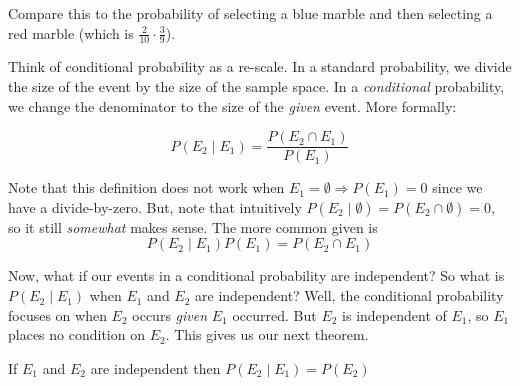 \documentclass[main.tex]{subfiles}
\begin{document}

\begin{rem}
	Compare this to the probability of selecting a blue marble and then selecting a red marble (which is \(\frac{2}{10} \cdot \frac{3}{9}\)).
\end{rem}

Think of conditional probability as a re-scale.
In a standard probability, we divide the size of the event by the size of the sample space.
In a \textit{conditional} probability, we change the denominator to the size of the \textit{given} event.
More formally:

\begin{prop}
	\[P(E_2 \mid E_1) = \frac{P(E_2 \cap E_1)}{P(E_1)}\]
\end{prop}

\begin{rem}
	Note that this definition does not work when \(E_1 = \emptyset \Rightarrow P(E_1) = 0\) since we have a divide-by-zero.
	But, note that intuitively \(P(E_2 \mid \emptyset) = P(E_2 \cap \emptyset) = 0\), so it still \textit{somewhat} makes sense.
	The more common  given is
	\[P(E_2 \mid E_1)P(E_1) = P(E_2 \cap E_1)\]
\end{rem}

Now, what if our events in a conditional probability are independent? So what is \(P(E_2 \mid E_1)\) when \(E_1\) and \(E_2\) are independent? Well, the conditional probability focuses on when \(E_2\) occurs \textit{given} \(E_1\) occurred. But \(E_2\) is independent of \(E_1\), so \(E_1\) places no condition on \(E_2\). This gives us our next theorem.

\begin{thm}
	If \(E_1\) and \(E_2\) are independent then \(P(E_2 \mid E_1) = P(E_2)\)
\end{thm}

\end{document}

